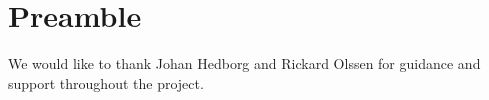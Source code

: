 
\section*{Preamble}

We would like to thank Johan Hedborg and Rickard Olssen for guidance and support throughout the project.